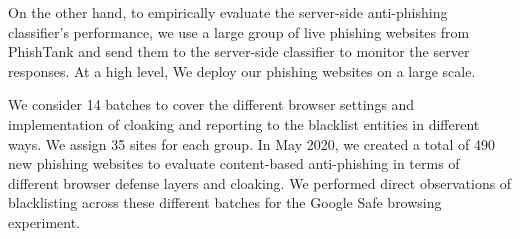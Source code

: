 \begin{table}
\centering
{}
\caption{Blacklisting evaluation metrics~\cite{oest2020phishtime}}
\label{tab:Blacklisting metrics}
\end{table}

On the other hand, to empirically evaluate the server-side anti-phishing classifier's performance, we use a large group of live phishing websites from PhishTank and send them to the server-side classifier to monitor the server responses.
At a high level, We deploy our phishing websites on a large scale. 

We consider 14 batches to cover the different browser settings and implementation of cloaking and reporting to the blacklist entities in different ways. We assign 35 sites for each group. In May 2020, we created a total of 490 new phishing websites to evaluate content-based anti-phishing in terms of different browser defense layers and cloaking. We performed direct observations of blacklisting across these different batches for the Google Safe browsing experiment. 

